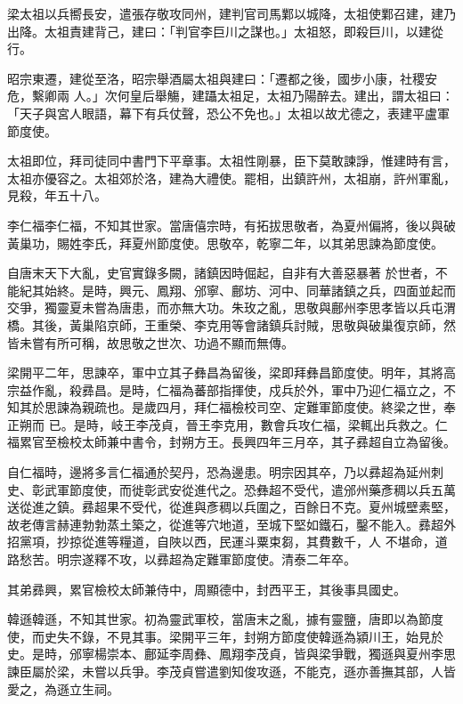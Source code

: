 \begin{pinyinscope}
 梁太祖以兵嚮長安，遣張存敬攻同州，建判官司馬鄴以城降，太祖使鄴召建，建乃出降。太祖責建背己，建曰：「判官李巨川之謀也。」太祖怒，即殺巨川，以建從行。



 昭宗東遷，建從至洛，昭宗舉酒屬太祖與建曰：「遷都之後，國步小康，社稷安危，繫卿兩
 人。」次何皇后舉觴，建躡太祖足，太祖乃陽醉去。建出，謂太祖曰：「天子與宮人眼語，幕下有兵仗聲，恐公不免也。」太祖以故尤德之，表建平盧軍節度使。



 太祖即位，拜司徒同中書門下平章事。太祖性剛暴，臣下莫敢諫諍，惟建時有言，太祖亦優容之。太祖郊於洛，建為大禮使。罷相，出鎮許州，太祖崩，許州軍亂，見殺，年五十八。



 李仁福李仁福，不知其世家。當唐僖宗時，有拓拔思敬者，為夏州偏將，後以與破黃巢功，賜姓李氏，拜夏州節度使。思敬卒，乾寧二年，以其弟思諫為節度使。



 自唐末天下大亂，史官實錄多闕，諸鎮因時倔起，自非有大善惡暴著
 於世者，不能紀其始終。是時，興元、鳳翔、邠寧、鄜坊、河中、同華諸鎮之兵，四面並起而交爭，獨靈夏未嘗為唐患，而亦無大功。朱玫之亂，思敬與鄜州李思孝皆以兵屯渭橋。其後，黃巢陷京師，王重榮、李克用等會諸鎮兵討賊，思敬與破巢復京師，然皆未嘗有所可稱，故思敬之世次、功過不顯而無傳。



 梁開平二年，思諫卒，軍中立其子彝昌為留後，梁即拜彝昌節度使。明年，其將高宗益作亂，殺彞昌。是時，仁福為蕃部指揮使，戍兵於外，軍中乃迎仁福立之，不知其於思諫為親疏也。是歲四月，拜仁福檢校司空、定難軍節度使。終梁之世，奉正朔而
 已。是時，岐王李茂貞，晉王李克用，數會兵攻仁福，梁輒出兵救之。仁福累官至檢校太師兼中書令，封朔方王。長興四年三月卒，其子彞超自立為留後。



 自仁福時，邊將多言仁福通於契丹，恐為邊患。明宗因其卒，乃以彞超為延州刺史、彰武軍節度使，而徙彰武安從進代之。恐彝超不受代，遣邠州藥彥稠以兵五萬送從進之鎮。彞超果不受代，從進與彥稠以兵圍之，百餘日不克。夏州城壁素堅，故老傳言赫連勃勃蒸土築之，從進等穴地道，至城下堅如鐵石，鑿不能入。彞超外招黨項，抄掠從進等糧道，自陜以西，民運斗粟束芻，其費數千，人
 不堪命，道路愁苦。明宗遂釋不攻，以彞超為定難軍節度使。清泰二年卒。



 其弟彞興，累官檢校太師兼侍中，周顯德中，封西平王，其後事具國史。



 韓遜韓遜，不知其世家。初為靈武軍校，當唐末之亂，據有靈鹽，唐即以為節度使，而史失不錄，不見其事。梁開平三年，封朔方節度使韓遜為潁川王，始見於史。是時，邠寧楊崇本、鄜延李周彝、鳳翔李茂貞，皆與梁爭戰，獨遜與夏州李思諫臣屬於梁，未嘗以兵爭。李茂貞嘗遣劉知俊攻遜，不能克，遜亦善撫其部，人皆愛之，為遜立生祠。




\end{pinyinscope}
